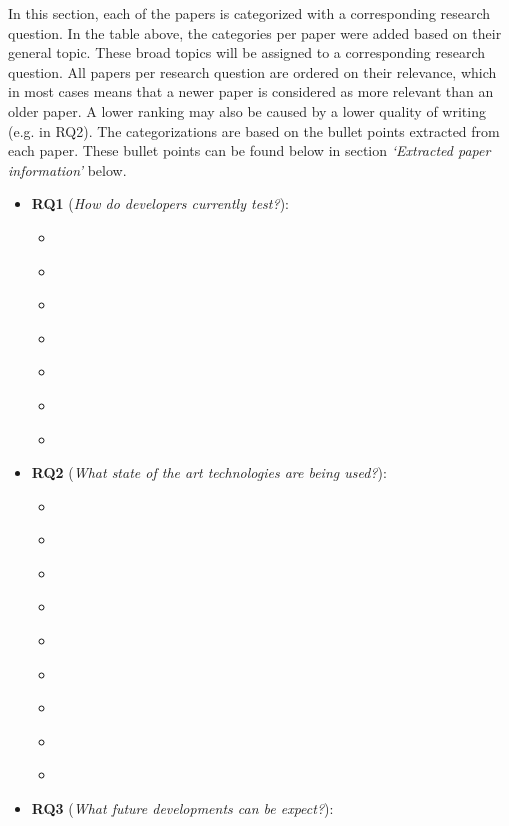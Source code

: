 \documentclass[]{book}
\providecommand{\tightlist}{%
  \setlength{\itemsep}{0pt}\setlength{\parskip}{0pt}}
\begin{document}
In this section, each of the papers is categorized with a corresponding
research question. In the table above, the categories per paper were
added based on their general topic. These broad topics will be assigned
to a corresponding research question. All papers per research question
are ordered on their relevance, which in most cases means that a newer
paper is considered as more relevant than an older paper. A lower
ranking may also be caused by a lower quality of writing (e.g.
\citet{greiler2013} in RQ2). The categorizations are based on the bullet
points extracted from each paper. These bullet points can be found below
in section \emph{`Extracted paper information'} below.

\begin{itemize}
\tightlist
\item
  \textbf{RQ1} (\emph{How do developers currently test?}):

  \begin{itemize}
  \tightlist
  \item
    \citet{beller2017developer}
  \item
    \citet{beller2015}
  \item
    \citet{marsavina2014}
  \item
    \citet{pinto2013}
  \item
    \citet{GAROUSI20131354}
  \item
    \citet{pinto2012understanding}
  \item
    \citet{zaidman2011studying}
  \end{itemize}
\item
  \textbf{RQ2} (\emph{What state of the art technologies are being
  used?}):

  \begin{itemize}
  \tightlist
  \item
    \citet{supportingtestsuite}
  \item
    \citet{vernotte2015}
  \item
    \citet{bowring2014obsidian}
  \item
    \citet{hurdugaci2012}
  \item
    \citet{robinson2011}
  \item
    \citet{greiler2013}
  \item
    \citet{dulz2013model}
  \item
    \citet{atifi2017}
  \item
    \citet{noor2015test}
  \end{itemize}
\item
  \textbf{RQ3} (\emph{What future developments can be expect?}):


\end{itemize}
\end{document}
